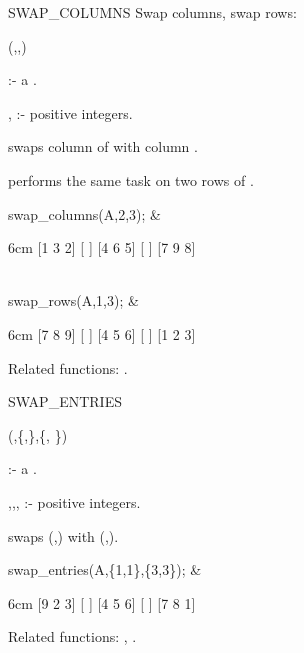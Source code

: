 \begin{Operator}[swapcolumns]{SWAP_COLUMNS}
Swap columns, swap rows:

\begin{Syntax}
 (,,)
\end{Syntax}

       :- a .

, :- positive integers. 
 
 swaps column  of  with 
column . 

 performs the same task on two rows of .

\begin{Examples}

swap_columns(A,2,3); &
\begin{multilineoutput}{6cm}
[1  3  2]
[       ]
[4  6  5]
[       ]
[7  9  8]
\end{multilineoutput}\\

swap_rows(A,1,3); &
\begin{multilineoutput}{6cm}
[7  8  9]
[       ]
[4  5  6]
[       ]
[1  2  3]
\end{multilineoutput}

\end{Examples}

Related functions: .

\end{Operator}


\begin{Operator}[swapentries]{SWAP_ENTRIES}

\begin{Syntax}
(,\{,\},\{,
\})
\end{Syntax}

  :- a . 

,,, :- positive integers.

 swaps (,) with 
(,).

\begin{Examples}

swap_entries(A,\{1,1\},\{3,3\}); &
\begin{multilineoutput}{6cm}
[9  2  3]
[       ]
[4  5  6]
[       ]
[7  8  1]
\end{multilineoutput}

\end{Examples}

Related functions: , .

\end{Operator}


